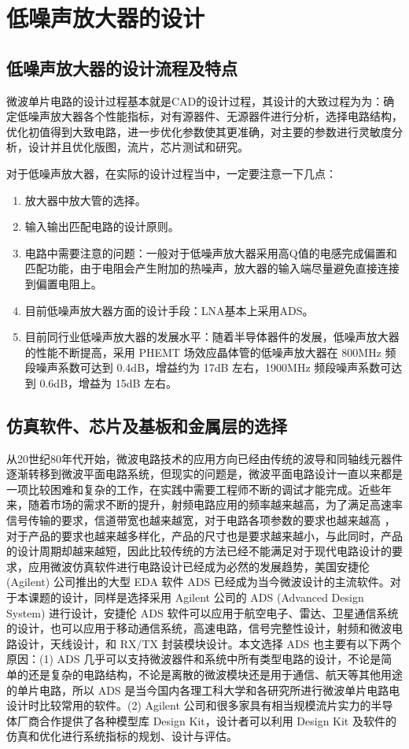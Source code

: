 
\chapter{低噪声放大器的设计}

\section{低噪声放大器的设计流程及特点}

微波单片电路的设计过程基本就是CAD的设计过程，其设计的大致过程为为：确定低噪声放大器各个性能指标，对有源器件、无源器件进行分析，选择电路结构，优化初值得到大致电路，进一步优化参数使其更准确，对主要的参数进行灵敏度分析，设计并且优化版图，流片，芯片测试和研究。

对于低噪声放大器，在实际的设计过程当中，一定要注意一下几点：
\begin{enumerate}
	\item 放大器中放大管的选择。
	\item 输入输出匹配电路的设计原则。
	\item 电路中需要注意的问题：一般对于低噪声放大器采用高Q值的电感完成偏置和匹配功能，由于电阻会产生附加的热噪声，放大器的输入端尽量避免直接连接到偏置电阻上。
	\item 目前低噪声放大器方面的设计手段：LNA基本上采用ADS。
	\item 目前同行业低噪声放大器的发展水平：随着半导体器件的发展，低噪声放大器的性能不断提高，采用 PHEMT 场效应晶体管的低噪声放大器在 800MHz 频段噪声系数可达到 0.4dB，增益约为 17dB 左右，1900MHz 频段噪声系数可达到 0.6dB，增益为 15dB 左右。
\end{enumerate}

\section{仿真软件、芯片及基板和金属层的选择}

从20世纪80年代开始，微波电路技术的应用方向已经由传统的波导和同轴线元器件逐渐转移到微波平面电路系统，但现实的问题是，微波平面电路设计一直以来都是一项比较困难和复杂的工作，在实践中需要工程师不断的调试才能完成。近些年来，随着市场的需求不断的提升，射频电路应用的频率越来越高，为了满足高速率信号传输的要求，信道带宽也越来越宽，对于电路各项参数的要求也越来越高 ，对于产品的要求也越来越多样化，产品的尺寸也是要求越来越小，与此同时，产品的设计周期却越来越短，因此比较传统的方法已经不能满足对于现代电路设计的要求，应用微波仿真软件进行电路设计已经成为必然的发展趋势，美国安捷伦 (Agilent) 公司推出的大型 EDA 软件 ADS 已经成为当今微波设计的主流软件。对于本课题的设计，同样是选择采用 Agilent 公司的 ADS  (Advanced Design System) 进行设计，安捷伦 ADS 软件可以应用于航空电子、雷达、卫星通信系统的设计，也可以应用于移动通信系统，高速电路，信号完整性设计，射频和微波电路设计，天线设计，和 RX/TX 封装模块设计。本文选择 ADS 也主要有以下两个原因：(1) ADS 几乎可以支持微波器件和系统中所有类型电路的设计，不论是简单的还是复杂的电路结构，不论是离散的微波模块还是用于通信、航天等其他用途的单片电路，所以 ADS 是当今国内各理工科大学和各研究所进行微波单片电路电设计时比较常用的软件。(2) Agilent 公司和很多家具有相当规模流片实力的半导体厂商合作提供了各种模型库 Design Kit，设计者可以利用 Design Kit 及软件的仿真和优化进行系统指标的规划、设计与评估。

